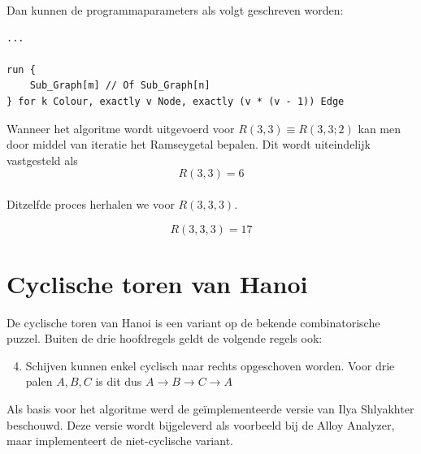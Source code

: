 \documentclass[10pt,a4paper]{article}
\begin{document}
		\noindent Dan kunnen de programmaparameters als volgt geschreven worden:\\

		\begin{lstlisting}
...

run {
	Sub_Graph[m] // Of Sub_Graph[n]
} for k Colour, exactly v Node, exactly (v * (v - 1)) Edge
		\end{lstlisting}

		Wanneer het algoritme wordt uitgevoerd voor $R(3, 3) \equiv R(3, 3; 2)$ kan men door middel van iteratie het Ramseygetal bepalen. Dit wordt uiteindelijk vastgesteld als
		\begin{equation}
			R(3, 3) = 6
		\end{equation}\\

		\noindent Ditzelfde proces herhalen we voor $R(3, 3, 3)$.

		\begin{equation}
			R(3, 3, 3) = 17
		\end{equation}

		\clearpage{}
		

	\clearpage{}
	\section{Cyclische toren van Hanoi}
		De cyclische toren van Hanoi is een variant op de bekende combinatorische puzzel. Buiten de drie hoofdregels geldt de volgende regels ook:
		\begin{enumerate}
			\setcounter{enumi}{3}
			\item Schijven kunnen enkel cyclisch naar rechts opgeschoven worden. Voor drie palen $A, B, C$ is dit dus $A \rightarrow B \rightarrow C \rightarrow A$
		\end{enumerate}

		\noindent Als basis voor het algoritme werd de ge\"implementeerde versie van Ilya Shlyakhter beschouwd. Deze versie wordt bijgeleverd als voorbeeld bij de Alloy Analyzer, maar implementeert de niet-cyclische variant.

		
\end{document}

